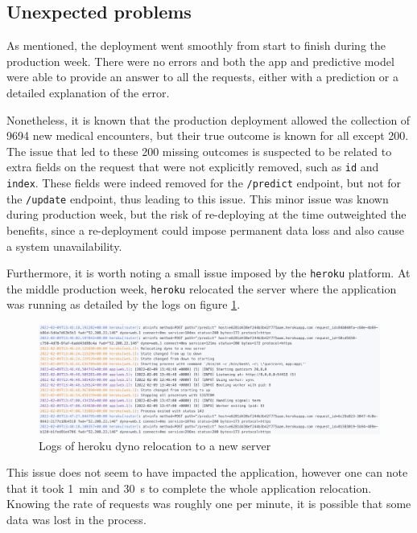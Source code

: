 \documentclass[a4paper,11pt]{article}
\begin{document}
\subsection{Unexpected problems}

As mentioned, the deployment went smoothly from start to finish during the production week. There were no errors and both the app and predictive model were able to provide an answer to all the requests, either with a prediction or a detailed explanation of the error.

Nonetheless, it is known that the production deployment allowed the collection of \SI{9694}{} new medical encounters, but their true outcome is known for all except \SI{200}{}. 
The issue that led to these \SI{200}{} missing outcomes is suspected to be related to extra fields on the request that were not explicitly removed, such as \texttt{id} and \texttt{index}.
These fields were indeed removed for the \texttt{/predict} endpoint, but not for the \texttt{/update} endpoint, thus leading to this issue.
This minor issue was known during production week, but the risk of re-deploying at the time outweighted the benefits, since a re-deployment could impose permanent data loss and also cause a system unavailability.

Furthermore, it is worth noting a small issue imposed by the \texttt{heroku} platform. At the middle production week, \texttt{heroku} relocated the server where the application was running as detailed by the logs on figure \ref{fig:heroku_relocating}.

\begin{figure}[!htb]
	\centering
	\includegraphics[width=1\textwidth]{images/log_screenshot.png}
	\caption{Logs of heroku dyno relocation to a new server}
	\label{fig:heroku_relocating}
\end{figure}

This issue does not seem to have impacted the application, however one can note that it took \SI{1}{\minute} and \SI{30}{\second} to complete the whole application relocation. Knowing the rate of requests was roughly one per minute, it is possible that some data was lost in the process.
\end{document}
